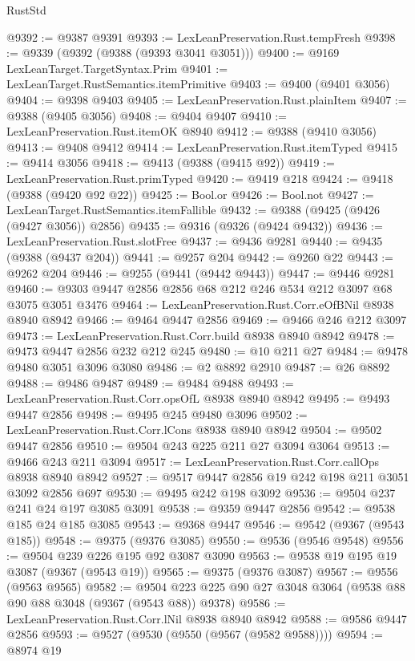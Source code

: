 \begin{lexlean}{RustStd}
\begin{coremodule}
@9392 := @9387 @9391
@9393 := LexLeanPreservation.Rust.tempFresh
@9398 := @9339 (@9392 (@9388 (@9393 @3041 @3051)))
@9400 := @9169 LexLeanTarget.TargetSyntax.Prim
@9401 := LexLeanTarget.RustSemantics.itemPrimitive
@9403 := @9400 (@9401 @3056)
@9404 := @9398 @9403
@9405 := LexLeanPreservation.Rust.plainItem
@9407 := @9388 (@9405 @3056)
@9408 := @9404 @9407
@9410 := LexLeanPreservation.Rust.itemOK @8940
@9412 := @9388 (@9410 @3056)
@9413 := @9408 @9412
@9414 := LexLeanPreservation.Rust.itemTyped
@9415 := @9414 @3056
@9418 := @9413 (@9388 (@9415 @92))
@9419 := LexLeanPreservation.Rust.primTyped
@9420 := @9419 @218
@9424 := @9418 (@9388 (@9420 @92 @22))
@9425 := Bool.or
@9426 := Bool.not
@9427 := LexLeanTarget.RustSemantics.itemFallible
@9432 := @9388 (@9425 (@9426 (@9427 @3056)) @2856)
@9435 := @9316 (@9326 (@9424 @9432))
@9436 := LexLeanPreservation.Rust.slotFree
@9437 := @9436 @9281
@9440 := @9435 (@9388 (@9437 @204))
@9441 := @9257 @204
@9442 := @9260 @22
@9443 := @9262 @204
@9446 := @9255 (@9441 (@9442 @9443))
@9447 := @9446 @9281
@9460 := @9303 @9447 @2856 @2856 @68 @212 @246 @534 @212 @3097 @68 @3075 @3051 @3476
@9464 := LexLeanPreservation.Rust.Corr.eOfBNil @8938 @8940 @8942
@9466 := @9464 @9447 @2856
@9469 := @9466 @246 @212 @3097
@9473 := LexLeanPreservation.Rust.Corr.build @8938 @8940 @8942
@9478 := @9473 @9447 @2856 @232 @212 @245
@9480 := @10 @211 @27
@9484 := @9478 @9480 @3051 @3096 @3080
@9486 := @2 @8892 @2910
@9487 := @26 @8892
@9488 := @9486 @9487
@9489 := @9484 @9488
@9493 := LexLeanPreservation.Rust.Corr.opsOfL @8938 @8940 @8942
@9495 := @9493 @9447 @2856
@9498 := @9495 @245 @9480 @3096
@9502 := LexLeanPreservation.Rust.Corr.lCons @8938 @8940 @8942
@9504 := @9502 @9447 @2856
@9510 := @9504 @243 @225 @211 @27 @3094 @3064
@9513 := @9466 @243 @211 @3094
@9517 := LexLeanPreservation.Rust.Corr.callOps @8938 @8940 @8942
@9527 := @9517 @9447 @2856 @19 @242 @198 @211 @3051 @3092 @2856 @697
@9530 := @9495 @242 @198 @3092
@9536 := @9504 @237 @241 @24 @197 @3085 @3091
@9538 := @9359 @9447 @2856
@9542 := @9538 @185 @24 @185 @3085
@9543 := @9368 @9447
@9546 := @9542 (@9367 (@9543 @185))
@9548 := @9375 (@9376 @3085)
@9550 := @9536 (@9546 @9548)
@9556 := @9504 @239 @226 @195 @92 @3087 @3090
@9563 := @9538 @19 @195 @19 @3087 (@9367 (@9543 @19))
@9565 := @9375 (@9376 @3087)
@9567 := @9556 (@9563 @9565)
@9582 := @9504 @223 @225 @90 @27 @3048 @3064 (@9538 @88 @90 @88 @3048 (@9367 (@9543 @88)) @9378)
@9586 := LexLeanPreservation.Rust.Corr.lNil @8938 @8940 @8942
@9588 := @9586 @9447 @2856
@9593 := @9527 (@9530 (@9550 (@9567 (@9582 @9588))))
@9594 := @8974 @19

\end{coremodule}
\end{lexlean}
